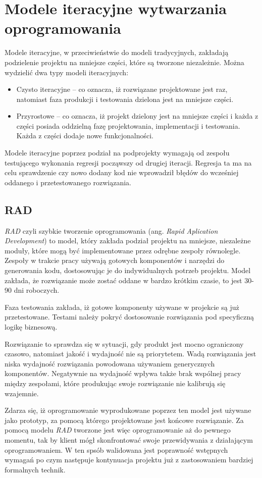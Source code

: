 \section{Modele iteracyjne wytwarzania oprogramowania}
Modele iteracyjne, w przeciwieństwie do modeli tradycyjnych, zakładają podzielenie projektu na mniejsze części, które są tworzone niezależnie. Można wydzielić dwa typy modeli iteracyjnych:
\begin{itemize}
  \item Czysto iteracyjne -- co oznacza, iż rozwiązane projektowane jest raz, natomiast faza produkcji i testowania dzielona jest na mniejsze części.
  \item Przyrostowe -- co oznacza, iż projekt dzielony jest na mniejsze części i każda z części posiada oddzielną fazę projektowania, implementacji i testowania. Każda z części dodaje nowe funkcjonalności.
 
\end{itemize}
 Modele iteracyjne poprzez podział na podprojekty wymagają od zespołu testującego wykonania regresji począwszy od drugiej iteracji. Regresja ta ma na celu sprawdzenie czy nowo dodany kod nie wprowadził błędów do wcześniej oddanego i przetestowanego rozwiązania.
\subsection{RAD}
\textit{RAD} czyli szybkie tworzenie oprogramowania (ang. \textit{Rapid Aplication Development}) to model, który zakłada podział projektu na mniejsze, niezależne moduły, które mogą być implementowane przez odrębne zespoły równolegle. Zespoły w trakcie pracy używają gotowych komponentów i narzędzi do generowania kodu, dostosowując je do indywidualnych potrzeb projektu. Model zakłada, że rozwiązanie może zostać oddane w bardzo krótkim czasie, to jest 30-90 dni roboczych.

Faza testowania zakłada, iż gotowe komponenty używane w projekcie są już przetestowane. Testami należy pokryć dostosowanie rozwiązania pod specyficzną logikę biznesową. 

Rozwiązanie to sprawdza się w sytuacji, gdy produkt jest mocno ograniczony czasowo, natomiast jakość i wydajność nie są priorytetem. Wadą rozwiązania jest niska wydajność rozwiązania powodowana używaniem generycznych komponentów. Negatywnie na wydajność wpływa także brak wspólnej pracy między zespołami, które produkując swoje rozwiązanie nie kalibrują się wzajemnie.

Zdarza się, iż oprogramowanie wyprodukowane poprzez ten model jest używane jako prototyp, za pomocą którego projektowane jest końcowe rozwiązanie. Za pomocą modelu \textit{RAD} tworzone jest więc oprogramowanie aż do pewnego momentu, tak by klient mógł skonfrontować swoje przewidywania z działającym oprogramowaniem. W ten spsób walidowana jest poprawność wstępnych wymagań po czym następuje kontynuacja projektu już z zastosowaniem bardziej formalnych technik.
